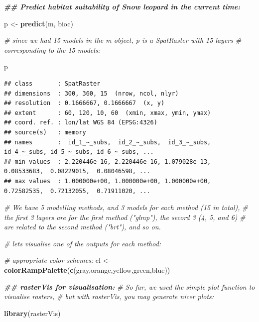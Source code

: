 \documentclass[
]{article}
\newenvironment{Shaded}{\begin{snugshade}}{\end{snugshade}}
\newcommand{\CommentTok}[1]{\textcolor[rgb]{0.56,0.35,0.01}{\textit{#1}}}
\newcommand{\DocumentationTok}[1]{\textcolor[rgb]{0.56,0.35,0.01}{\textbf{\textit{#1}}}}
\newcommand{\FunctionTok}[1]{\textcolor[rgb]{0.13,0.29,0.53}{\textbf{#1}}}
\newcommand{\NormalTok}[1]{#1}
\newcommand{\OtherTok}[1]{\textcolor[rgb]{0.56,0.35,0.01}{#1}}
\newcommand{\StringTok}[1]{\textcolor[rgb]{0.31,0.60,0.02}{#1}}
\begin{document}
\begin{Shaded}
\begin{Highlighting}[]
\DocumentationTok{\#\# Predict habitat suitability of Snow leopard in the current time:}

\NormalTok{p }\OtherTok{\textless{}{-}} \FunctionTok{predict}\NormalTok{(m, bioc)}

\CommentTok{\# since we had 15 models in the \textasciigrave{}m\textasciigrave{} object, \textasciigrave{}p\textasciigrave{} is a SpatRaster with 15 layers }
\CommentTok{\# corresponding to the 15 models:}

\NormalTok{p}
\end{Highlighting}
\end{Shaded}

\begin{verbatim}
## class       : SpatRaster 
## dimensions  : 300, 360, 15  (nrow, ncol, nlyr)
## resolution  : 0.1666667, 0.1666667  (x, y)
## extent      : 60, 120, 10, 60  (xmin, xmax, ymin, ymax)
## coord. ref. : lon/lat WGS 84 (EPSG:4326) 
## source(s)   : memory
## names       :  id_1_~_subs,  id_2_~_subs,  id_3_~_subs, id_4_~_subs, id_5_~_subs, id_6_~_subs, ... 
## min values  : 2.220446e-16, 2.220446e-16, 1.079028e-13,  0.08533683,  0.08229015,  0.08046598, ... 
## max values  : 1.000000e+00, 1.000000e+00, 1.000000e+00,  0.72582535,  0.72132055,  0.71911020, ...
\end{verbatim}

\begin{Shaded}
\begin{Highlighting}[]
\CommentTok{\# We have 5 modelling methods, and 3 models for each method (15 in total),}
\CommentTok{\# the first 3 layers are for the first method ("glmp"), the secord 3 (4, 5, and 6)}
\CommentTok{\# are related to the second method ("brt"), and so on.}

\CommentTok{\# let\textquotesingle{}s visualise one of the outputs for each method:}

\CommentTok{\# appropriate color schemes:}
\NormalTok{cl }\OtherTok{\textless{}{-}} \FunctionTok{colorRampPalette}\NormalTok{(}\FunctionTok{c}\NormalTok{(}\StringTok{\textquotesingle{}gray\textquotesingle{}}\NormalTok{,}\StringTok{\textquotesingle{}orange\textquotesingle{}}\NormalTok{,}\StringTok{\textquotesingle{}yellow\textquotesingle{}}\NormalTok{,}\StringTok{\textquotesingle{}green\textquotesingle{}}\NormalTok{,}\StringTok{\textquotesingle{}blue\textquotesingle{}}\NormalTok{)) }

\DocumentationTok{\#\# rasterVis for visualisation:}
\CommentTok{\# So far, we used the simple plot function to visualise rasters,}
\CommentTok{\# but with rasterVis, you may generate nicer plots:}

\FunctionTok{library}\NormalTok{(rasterVis)}
\end{Highlighting}
\end{Shaded}
\end{document}
